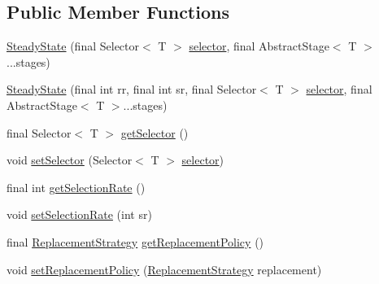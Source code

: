 \subsection*{Public Member Functions}
\begin{CompactItemize}
\item 
\hyperlink{classjenes_1_1stage_1_1operator_1_1common_1_1_steady_state_3_01_t_01extends_01_chromosome_01_4_f39cd5e467ed1a020779c89894c5f63e}{SteadyState} (final Selector$<$ T $>$ \hyperlink{classjenes_1_1stage_1_1operator_1_1common_1_1_steady_state_3_01_t_01extends_01_chromosome_01_4_83a734a69acdc4ee13d42982a43e8ba1}{selector}, final AbstractStage$<$ T $>$...stages)
\item 
\hyperlink{classjenes_1_1stage_1_1operator_1_1common_1_1_steady_state_3_01_t_01extends_01_chromosome_01_4_3411aeb67d5f0914fdb6682627a507c9}{SteadyState} (final int rr, final int sr, final Selector$<$ T $>$ \hyperlink{classjenes_1_1stage_1_1operator_1_1common_1_1_steady_state_3_01_t_01extends_01_chromosome_01_4_83a734a69acdc4ee13d42982a43e8ba1}{selector}, final AbstractStage$<$ T $>$...stages)
\item 
final Selector$<$ T $>$ \hyperlink{classjenes_1_1stage_1_1operator_1_1common_1_1_steady_state_3_01_t_01extends_01_chromosome_01_4_c9493ab808eed1e19961d6ba1b97b52d}{getSelector} ()
\item 
void \hyperlink{classjenes_1_1stage_1_1operator_1_1common_1_1_steady_state_3_01_t_01extends_01_chromosome_01_4_d4c63d6921648fac68ea074d8fb49002}{setSelector} (Selector$<$ T $>$ \hyperlink{classjenes_1_1stage_1_1operator_1_1common_1_1_steady_state_3_01_t_01extends_01_chromosome_01_4_83a734a69acdc4ee13d42982a43e8ba1}{selector})
\item 
final int \hyperlink{classjenes_1_1stage_1_1operator_1_1common_1_1_steady_state_3_01_t_01extends_01_chromosome_01_4_667fecf88fd68c6a89de0ee327eb9dcf}{getSelectionRate} ()
\item 
void \hyperlink{classjenes_1_1stage_1_1operator_1_1common_1_1_steady_state_3_01_t_01extends_01_chromosome_01_4_d3182abb1581d4136efe349b46c4dba9}{setSelectionRate} (int sr)
\item 
final \hyperlink{classjenes_1_1stage_1_1operator_1_1common_1_1_steady_state_3_01_t_01extends_01_chromosome_01_4_da95b83b7d620e80c70fbed3b8159de1}{ReplacementStrategy} \hyperlink{classjenes_1_1stage_1_1operator_1_1common_1_1_steady_state_3_01_t_01extends_01_chromosome_01_4_e8a1e24e3306c72bdf30094774b68915}{getReplacementPolicy} ()
\item 
void \hyperlink{classjenes_1_1stage_1_1operator_1_1common_1_1_steady_state_3_01_t_01extends_01_chromosome_01_4_b142c49cb09d7325f9bcc5d029acd36b}{setReplacementPolicy} (\hyperlink{classjenes_1_1stage_1_1operator_1_1common_1_1_steady_state_3_01_t_01extends_01_chromosome_01_4_da95b83b7d620e80c70fbed3b8159de1}{ReplacementStrategy} replacement)

\end{CompactItemize}
